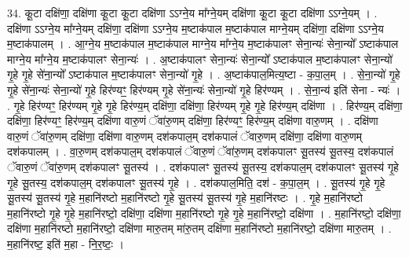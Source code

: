 \documentclass[17pt]{extarticle}
\begin{document}
34. कू॒टा दक्षि॑णा॒ दक्षि॑णा कू॒टा कू॒टा दक्षि॑णा ऽऽग्ने॒य मा᳚ग्ने॒यम् दक्षि॑णा कू॒टा कू॒टा दक्षि॑णा ऽऽग्ने॒यम् । . दक्षि॑णा ऽऽग्ने॒य मा᳚ग्ने॒यम् दक्षि॑णा॒ दक्षि॑णा ऽऽग्ने॒य म॒ष्टाक॑पाल म॒ष्टाक॑पाल माग्ने॒यम् दक्षि॑णा॒ दक्षि॑णा ऽऽग्ने॒य म॒ष्टाक॑पालम् । . आ॒ग्ने॒य म॒ष्टाक॑पाल म॒ष्टाक॑पाल माग्ने॒य मा᳚ग्ने॒य म॒ष्टाक॑पालꣳ सेना॒न्यः॑ सेना॒न्यो᳚ ऽष्टाक॑पाल माग्ने॒य मा᳚ग्ने॒य म॒ष्टाक॑पालꣳ सेना॒न्यः॑ । . अ॒ष्टाक॑पालꣳ सेना॒न्यः॑ सेना॒न्यो᳚ ऽष्टाक॑पाल म॒ष्टाक॑पालꣳ सेना॒न्यो॑ गृ॒हे गृ॒हे से॑ना॒न्यो᳚ ऽष्टाक॑पाल म॒ष्टाक॑पालꣳ सेना॒न्यो॑ गृ॒हे । . अ॒ष्टाक॑पाल॒मित्य॒ष्टा - क॒पा॒ल॒म् । . से॒ना॒न्यो॑ गृ॒हे गृ॒हे से॑ना॒न्यः॑ सेना॒न्यो॑ गृ॒हे हिर॑ण्यꣳ॒॒ हिर॑ण्यम् गृ॒हे से॑ना॒न्यः॑ सेना॒न्यो॑ गृ॒हे हिर॑ण्यम् । . से॒ना॒न्य॑ इति॑ सेना - न्यः॑ । . गृ॒हे हिर॑ण्यꣳ॒॒ हिर॑ण्यम् गृ॒हे गृ॒हे हिर॑ण्य॒म् दक्षि॑णा॒ दक्षि॑णा॒ हिर॑ण्यम् गृ॒हे गृ॒हे हिर॑ण्य॒म् दक्षि॑णा । . हिर॑ण्य॒म् दक्षि॑णा॒ दक्षि॑णा॒ हिर॑ण्यꣳ॒॒ हिर॑ण्य॒म् दक्षि॑णा वारु॒णं ॅवा॑रु॒णम् दक्षि॑णा॒ हिर॑ण्यꣳ॒॒ हिर॑ण्य॒म् दक्षि॑णा वारु॒णम् । . दक्षि॑णा वारु॒णं ॅवा॑रु॒णम् दक्षि॑णा॒ दक्षि॑णा वारु॒णम् दश॑कपाल॒म् दश॑कपालं ॅवारु॒णम् दक्षि॑णा॒ दक्षि॑णा वारु॒णम् दश॑कपालम् । . वा॒रु॒णम् दश॑कपाल॒म् दश॑कपालं ॅवारु॒णं ॅवा॑रु॒णम् दश॑कपालꣳ सू॒तस्य॑ सू॒तस्य॒ दश॑कपालं ॅवारु॒णं ॅवा॑रु॒णम् दश॑कपालꣳ सू॒तस्य॑ । . दश॑कपालꣳ सू॒तस्य॑ सू॒तस्य॒ दश॑कपाल॒म् दश॑कपालꣳ सू॒तस्य॑ गृ॒हे गृ॒हे सू॒तस्य॒ दश॑कपाल॒म् दश॑कपालꣳ सू॒तस्य॑ गृ॒हे । . दश॑कपाल॒मिति॒ दश॑ - क॒पा॒ल॒म् । . सू॒तस्य॑ गृ॒हे गृ॒हे सू॒तस्य॑ सू॒तस्य॑ गृ॒हे म॒हानि॑रष्टो म॒हानि॑रष्टो गृ॒हे सू॒तस्य॑ सू॒तस्य॑ गृ॒हे म॒हानि॑रष्टः । . गृ॒हे म॒हानि॑रष्टो म॒हानि॑रष्टो गृ॒हे गृ॒हे म॒हानि॑रष्टो॒ दक्षि॑णा॒ दक्षि॑णा म॒हानि॑रष्टो गृ॒हे गृ॒हे म॒हानि॑रष्टो॒ दक्षि॑णा । . म॒हानि॑रष्टो॒ दक्षि॑णा॒ दक्षि॑णा म॒हानि॑रष्टो म॒हानि॑रष्टो॒ दक्षि॑णा मारु॒तम् मा॑रु॒तम् दक्षि॑णा म॒हानि॑रष्टो म॒हानि॑रष्टो॒ दक्षि॑णा मारु॒तम् । . म॒हानि॑रष्ट॒ इति॑ म॒हा - नि॒र॒ष्टः॒ । \newline
\end{document}
